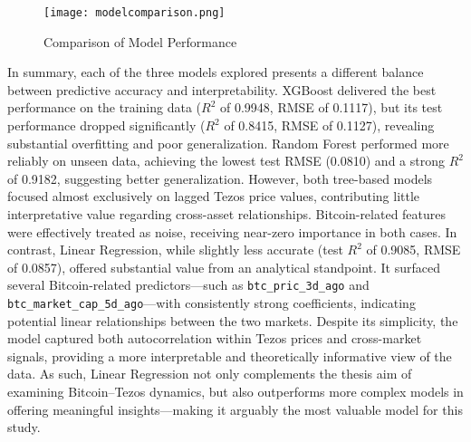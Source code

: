 \begin{figure}[H]
    \centering
    \texttt{[image: modelcomparison.png]}
    \caption{Comparison of Model Performance}
    \label{fig:model-comparison}
\end{figure}

In summary, each of the three models explored presents a different balance between predictive accuracy and interpretability. 
XGBoost delivered the best performance on the training data ($R^2$ of 0.9948, RMSE of 0.1117), but its test performance dropped significantly ($R^2$ of 0.8415, RMSE of 0.1127), revealing substantial overfitting and poor generalization. Random Forest performed more reliably on unseen data, achieving the lowest test RMSE (0.0810) and a strong $R^2$ of 0.9182, suggesting better generalization. However, both tree-based models focused almost exclusively on lagged Tezos price values, contributing little interpretative value regarding cross-asset relationships. 
Bitcoin-related features were effectively treated as noise, receiving near-zero importance in both cases.
In contrast, Linear Regression, while slightly less accurate (test $R^2$ of 0.9085, RMSE of 0.0857), offered substantial value from an analytical standpoint. 
It surfaced several Bitcoin-related predictors—such as \texttt{btc\_pric\_3d\_ago} and \texttt{btc\_market\_cap\_5d\_ago}—with consistently strong coefficients, indicating potential linear relationships between the two markets. 
Despite its simplicity, the model captured both autocorrelation within Tezos prices and cross-market signals, providing a more interpretable and theoretically informative view of the data. 
As such, Linear Regression not only complements the thesis aim of examining Bitcoin–Tezos dynamics, but also outperforms more complex models in offering meaningful insights—making it arguably the most valuable model for this study.